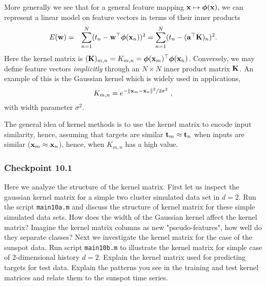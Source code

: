 \documentclass[12pt]{article}    %
\def\xb{{\bf x}}
\def\wb{{\bf w}}
\def\phib{\text{\boldmath $\phi$}}
\def\tb{{\bf t}}
\def\Kb{{\bf K}}
\def\ab{{\bf a}}
\begin{document}
More generally we see that for a general feature mapping $\xb \mapsto \phib(\xb)$, we can represent a linear model on feature vectors in terms of their inner products
\begin{eqnarray}
E(\wb) &=& \sum_{n =1}^{N}( t_n - \wb^{\top}\phib(\xb_n) )^2 =\sum_{n =1}^{N}( t_n - (\ab^{\top} \Kb)_n )^2.
\end{eqnarray}
Here the kernel matrix is $(\Kb)_{m,n} = K_{m,n}=\phib(\xb_m)^{\top}\phib(\xb_n)$. Conversely, we may define feature vectors
\emph{implicitly} through an $N \times N$ inner product matrix $\Kb$. An example of this is the Gaussian kernel which is widely used in applications,
\begin{equation}
 K_{m,n} = e^{ -\| \xb_m -\xb_n \|^2/2\sigma^2 } \ ,
\end{equation}
with width parameter $\sigma^2$.

The general idea of kernel methods is to use the kernel matrix to encode input similarity, hence, assuming that targets are similar $\tb_m \approx \tb_n$ when inputs are similar ($\xb_m \approx \xb_n$), hence, when $K_{m,n}$ has a high value.

\subsubsection*{Checkpoint 10.1}
Here we analyze the structure of the kernel matrix. First let us inspect the gaussian kernel matrix for a simple two cluster simulated data set in $d=2$.
Run the script {\tt main10a.m} and discuss the structure of kernel matrix for these simple simulated data sets. How does the width of the Gaussian kernel affect the kernel matrix? Imagine the kernel matrix columns as new "pseudo-features", how well do they separate classes?
Next we investigate the kernel matrix for the case of the sunspot data. Run script {\tt main10b.m} to illustrate the kernel matrix for simple case of 2-dimensional history $d = 2$. Explain the kernel matrix used for predicting targets for test data. Explain the patterns you see in the training and test kernel matrices and relate them to the sunspot time series.
\end{document}
